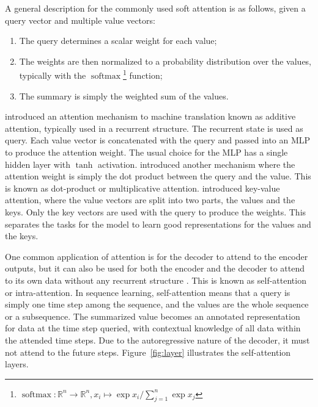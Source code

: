 \documentclass[11pt,twocolumn]{article}
\DeclareMathOperator{\softmax}{softmax}
\begin{document}
A general description for the commonly used soft attention is as follows,
given a query vector and multiple value vectors:

\begin{enumerate}
  \item The query determines a scalar weight for each value;
  \item The weights are then normalized to a probability distribution over the values, typically with
    the \(\softmax\)\footnote{\(\softmax : \mathbb{R}^{n} \to \mathbb{R}^{n},
      x_{i} \mapsto \exp x_{i} / \sum_{j=1}^{n}{\exp x_{j}}\)} function;
  \item The summary is simply the weighted sum of the values.
\end{enumerate}

\textcite{bahdanau2014neural} introduced an attention mechanism to machine translation known as additive attention,
typically used in a recurrent structure.
The recurrent state is used as query.
Each value vector is concatenated with the query and passed into an MLP to produce the attention weight.
The usual choice for the MLP has a single hidden layer with \(\tanh\) activation.
\textcite{luong2015effective} introduced another mechanism where the attention weight is simply
the dot product between the query and the value.
This is known as dot-product or multiplicative attention.
\textcite{daniluk2017frustratingly} introduced key-value attention,
where the value vectors are split into two parts, the values and the keys.
Only the key vectors are used with the query to produce the weights.
This separates the tasks for the model to learn good representations for the values and the keys.

One common application of attention is for the decoder to attend to the encoder outputs,
but it can also be used for both the encoder and the decoder to attend to its own data
without any recurrent structure \parencite{parikh2016decomposable}.
This is known as self-attention or intra-attention.
In sequence learning, self-attention means that a query is simply one time step among the sequence,
and the values are the whole sequence or a subsequence.
The summarized value becomes an annotated representation for data at the time step queried,
with contextual knowledge of all data within the attended time steps.
Due to the autoregressive nature of the decoder,
it must not attend to the future steps.
Figure~\ref{fig:layer} illustrates the self-attention layers.
\end{document}
